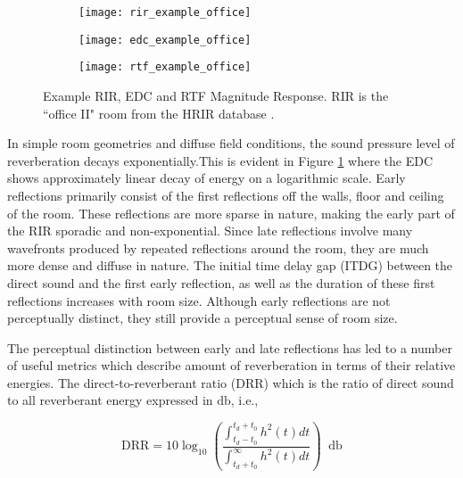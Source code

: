 \begin{figure}[H]
	\centering
	\begin{subfigure}[b]{0.7\textwidth}
		\centering
		\texttt{[image: rir\_example\_office]}
	\end{subfigure}
	\hfill
	\begin{subfigure}[b]{0.7\textwidth}
		\centering
		\texttt{[image: edc\_example\_office]}
	\end{subfigure}
	\hfill
	\begin{subfigure}[b]{0.7\textwidth}
		\centering
		\texttt{[image: rtf\_example\_office]}
	\end{subfigure}
	\caption[Example of a room impulse response (RIR), energy decay curve (EDC) and room transfer function (RTF) magnitude response]{Example RIR, EDC and RTF Magnitude Response. RIR is the ``office II" room from the HRIR database \citep{kayser2009database}.}
	\label{fig:RIR_EDC_RTF_Example}
\end{figure}

In simple room geometries and diffuse field conditions, the sound pressure level of reverberation decays exponentially.This is evident in Figure \ref{fig:RIR_EDC_RTF_Example} where the EDC shows approximately linear decay of energy on a logarithmic scale. Early reflections primarily consist of the first reflections off the walls, floor and ceiling of the room. These reflections are more sparse in nature, making the early part of the RIR sporadic and non-exponential. Since late reflections involve many wavefronts produced by repeated reflections around the room, they are much more dense and diffuse in nature. The initial time delay gap (ITDG) between the direct sound and the first early reflection, as well as the duration of these first reflections increases with room size. Although early reflections are not perceptually distinct, they still provide a perceptual sense of room size.

The perceptual distinction between early and late reflections has led to a number of useful metrics which describe amount of reverberation in terms of their relative energies. The direct-to-reverberant ratio (DRR) which is the ratio of direct sound to all reverberant energy expressed in $\unit{\decibel}$, i.e.,

\begin{equation}
	\mathrm{DRR} = 10\log_{10}\left(\frac{\int_{t_d-t_0}^{t_d+t_0}h^2(t)dt}{\int_{t_d+t_0}^{\infty}h^2(t)dt}\right)\;\;\unit{\decibel}
\end{equation}

